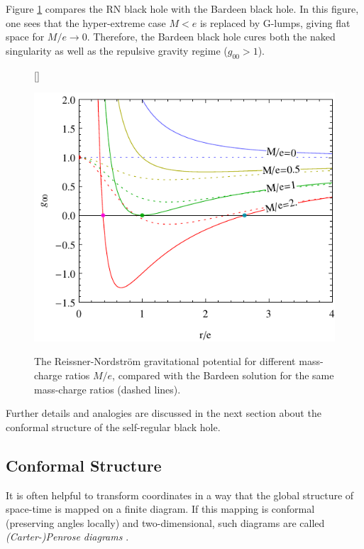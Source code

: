 \documentclass[12pt,a4paper]{report}
\numberwithin{equation}{chapter}
\begin{document}
Figure \ref{fig:rn-g00} compares the RN black hole with the Bardeen black hole. In this figure, one sees that the hyper-extreme case $M < e$ is replaced by G-lumps, giving flat space for $M/e\to 0$. Therefore, the Bardeen black hole cures both the naked singularity as well as the repulsive gravity regime ($g_{00}>1$).

\begin{figure}[h!]
[\FBwidth]{%
\caption[Plot of the Reissner-Nördstrom and Bardeen potential]{The Reissner-Nordström gravitational potential for different mass-charge ratios $M/e$, compared with the Bardeen solution for the same mass-charge ratios (dashed lines).
}\label{fig:rn-g00}%
}{\includegraphics[scale=1]{figures/reissner-nordstrom-me.pdf}}
\end{figure}

Further details and analogies are discussed in the next section about the conformal structure of the self-regular black hole.

\subsection{Conformal Structure}\label{sec:conformal}
It is often helpful to transform coordinates in a way that the global structure of space-time is mapped on a finite diagram. If this mapping is conformal (preserving angles locally) and two-dimensional, such diagrams are called \emph{(Carter-)Penrose diagrams} \cite{WaldGR,griffiths2009exact,MTW}.
\end{document}
